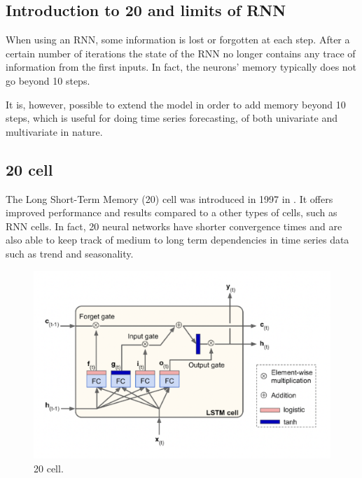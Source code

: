 \subsection{Introduction to 20 and limits of RNN}
When using an RNN, some information is lost  or forgotten at each step. After a certain number of iterations the state of the RNN no longer contains any trace of information from the first inputs. In fact, the neurons' memory typically does not go beyond 10 steps.

It is, however, possible to extend the model in order to add memory beyond 10 steps, which is useful for doing time series forecasting, of both univariate and multivariate in nature.

\subsection{20 cell} \label{20cell}
The Long Short-Term Memory (20) cell was introduced in 1997 in \citeauthor{20} \autocite{20}.
It offers improved performance and results compared to a other types of cells, such as RNN cells. In fact, 20 neural networks have shorter convergence times and are also able to keep track of medium to long term dependencies in time series data such as trend and seasonality.

\begin{figure} [h!]
    \centering
    \includegraphics[width=\textwidth,height=\textheight,keepaspectratio]{Assets/Theory_and_methods/unnamed-8.png}
    \caption{20 cell.}
    \label{fig:20_cell}
\end{figure}

